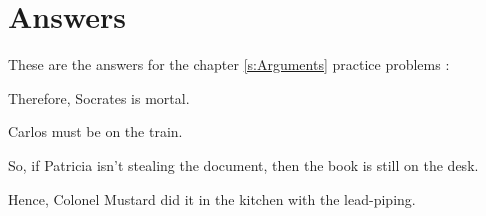 
\section{Answers}

These are the answers for the chapter \ref{s:Arguments} practice problems \label{ch1-answers}:

\begin{earg}
	\item Therefore, Socrates is mortal.
	\item Carlos must be on the train.
	\item So, if Patricia isn't stealing the document, then the book is still on the desk.
	\item Hence, Colonel Mustard did it in the kitchen with the lead-piping. 
\end{earg}


\setcounter{ProbPart}{0}


